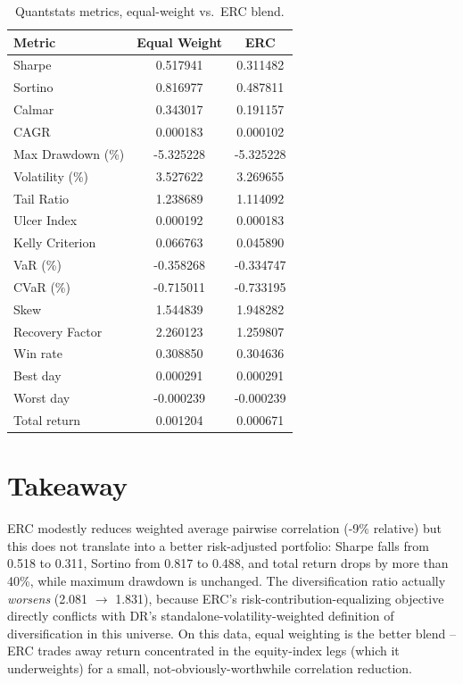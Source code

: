 \documentclass[11pt]{article}
\begin{document}
\begin{table}[h]
\centering
\caption{Quantstats metrics, equal-weight vs.\ ERC blend.}
\begin{tabular}{lS[table-format=1.6]S[table-format=1.6]}
\toprule
Metric & {Equal Weight} & {ERC} \\
\midrule
Sharpe & 0.517941 & 0.311482 \\
Sortino & 0.816977 & 0.487811 \\
Calmar & 0.343017 & 0.191157 \\
CAGR & 0.000183 & 0.000102 \\
Max Drawdown (\%) & -5.325228 & -5.325228 \\
Volatility (\%) & 3.527622 & 3.269655 \\
Tail Ratio & 1.238689 & 1.114092 \\
Ulcer Index & 0.000192 & 0.000183 \\
Kelly Criterion & 0.066763 & 0.045890 \\
VaR (\%) & -0.358268 & -0.334747 \\
CVaR (\%) & -0.715011 & -0.733195 \\
Skew & 1.544839 & 1.948282 \\
Recovery Factor & 2.260123 & 1.259807 \\
\midrule
Win rate & 0.308850 & 0.304636 \\
Best day & 0.000291 & 0.000291 \\
Worst day & -0.000239 & -0.000239 \\
Total return & 0.001204 & 0.000671 \\
\bottomrule
\end{tabular}
\end{table}

\section{Takeaway}

ERC modestly reduces weighted average pairwise correlation (-9\% relative) but this
does not translate into a better risk-adjusted portfolio: Sharpe falls from 0.518 to
0.311, Sortino from 0.817 to 0.488, and total return drops by more than 40\%, while
maximum drawdown is unchanged. The diversification ratio actually \emph{worsens}
(2.081 $\to$ 1.831), because ERC's risk-contribution-equalizing objective directly
conflicts with DR's standalone-volatility-weighted definition of diversification in
this universe. On this data, equal weighting is the better blend -- ERC trades away
return concentrated in the equity-index legs (which it underweights) for a small,
not-obviously-worthwhile correlation reduction.
\end{document}
